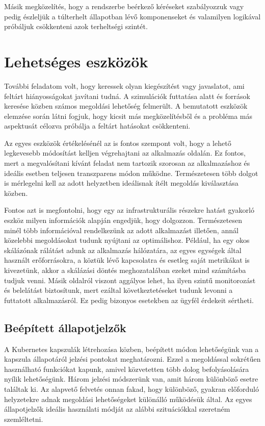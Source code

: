 Másik megközelítés, hogy a rendszerbe beérkező kéréseket szabályozzuk vagy pedig észleljük a túlterhelt állapotban lévő komponenseket és valamilyen logikával próbáljuk csökkenteni azok terheltségi szintét.

\section{Lehetséges eszközök}

További feladatom volt, hogy keressek olyan kiegészítést vagy javaslatot, ami feltárt hiányosságokat javítani tudná.
A szimulációk futtatása alatt és források keresése közben számos megoldási lehetőség felmerült.
A bemutatott eszközök elemzése során látni fogjuk, hogy kicsit más megközelítésből és a probléma más aspektusát célozva próbálja a feltárt hatásokat csökkenteni.

Az egyes eszközök értékelésénél az is fontos szempont volt, hogy a lehető legkevesebb módosítást kelljen végrehajtani az alkalmazás oldalán.
Ez fontos, mert a megvalósítani kívánt feladat nem tartozik szorosan az alkalmazáshoz és ideális esetben teljesen transzparens módon működne.
Természetesen több dolgot is mérlegelni kell az adott helyzetben ideálisnak ítélt megoldás kiválasztása közben.

Fontos azt is megfontolni, hogy egy az infrastrukturális részekre hatást gyakorló eszköz milyen információk alapján engedjük, hogy dolgozzon.
Természetesen minél több információval rendelkezünk az adott alkalmazást illetően, annál közelebbi megoldásokat tudunk nyújtani az optimálishoz.
Például, ha egy okos skálázónak rálátást adunk az alkalmazás hálózatára, az egyes egységek által használt erőforrásokra, a köztük lévő kapcsolatra és esetleg saját metrikákat is kivezetünk, akkor a skálázási döntés meghozatalában ezeket mind számításba tudjuk venni.
Másik oldalról viszont aggályos lehet, ha ilyen szintű monitorozást és belelátást biztosítunk, mert ezáltal következtetéseket tudunk levonni a futtatott alkalmazásról.
Ez pedig bizonyos esetekben az ügyfél érdekeit sértheti.


\subsection{Beépített állapotjelzők}
A Kubernetes kapszulák létrehozása közben, beépített módon lehetőségünk van a kapszula állapotáról jelzési pontokat meghatározni.
Ezzel a megoldással sokrétűen használható funkciókat kapunk, amivel közvetetten több dolog befolyásolására nyílik lehetőségünk.
Három jelzési módszerünk van, amit három különböző esetre találtak ki.
Az alapvető felvetés onnan fakad, hogy különböző, gyakran előforduló helyzetekre adnak megoldási lehetőségeket különálló működésük által.
Az egyes állapotjelzők ideális használati módját az alábbi szituációkkal szeretném szemléltetni.

